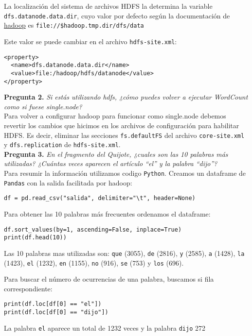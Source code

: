 \documentclass[11pt]{article}
\begin{document}
La localización del sistema de archivos HDFS la determina la variable \texttt{dfs.datanode.data.dir}, cuyo valor por defecto según la documentación de \href{https://hadoop.apache.org/docs/r2.4.1/hadoop-project-dist/hadoop-hdfs/hdfs-default.xml}{hadoop} es \texttt{file://\${hadoop.tmp.dir}/dfs/data}

Este valor se puede cambiar en el archivo \texttt{hdfs-site.xml}:

\begin{verbatim}
<property>
  <name>dfs.datanode.data.dir</name>
  <value>file:/hadoop/hdfs/datanode</value>
</property>
\end{verbatim}

\textbf{Pregunta 2. }\emph{Si estás utilizando hdfs, ¿cómo puedes volver a ejecutar WordCount como si fuese single.node?}\\

Para volver a configurar hadoop para funcionar como single.node debemos revertir los cambios que hicimos en los archivos de configuración para habilitar HDFS. Es decir, eliminar las secciones \texttt{fs.defaultFS} del archivo \texttt{core-site.xml} y \texttt{dfs.replication} de \texttt{hdfs-site.xml}.\\


\textbf{Pregunta 3. }\emph{En el fragmento del Quijote, ¿cuales son las 10 palabras más utilizadas? ¿Cuántas veces aparecen el artículo ``el'' y la palabra ``dijo''?}\\

Para resumir la información utilizamos codigo \texttt{Python}. Creamos un dataframe de \texttt{Pandas} con la salida facilitada por hadoop:
\begin{verbatim}
df = pd.read_csv("salida", delimiter="\t", header=None)
\end{verbatim}

Para obtener las 10 palabras más frecuentes ordenamos el dataframe:
\begin{verbatim}
df.sort_values(by=1, ascending=False, inplace=True)
print(df.head(10))
\end{verbatim}

Las 10 palabras mas utilizadas son: \texttt{que} (3055), \texttt{de} (2816), \texttt{y} (2585), \texttt{a} (1428), \texttt{la} (1423), \texttt{el} (1232), \texttt{en} (1155), \texttt{no} (916), \texttt{se} (753) y \texttt{los} (696).

Para buscar el número de ocurrencias de una palabra, buscamos si fila correspondiente:
\begin{verbatim}
print(df.loc[df[0] == "el"])
print(df.loc[df[0] == "dijo"])
\end{verbatim}

La palabra \texttt{el} aparece un total de 1232 veces y la palabra \texttt{dijo} 272
\end{document}

